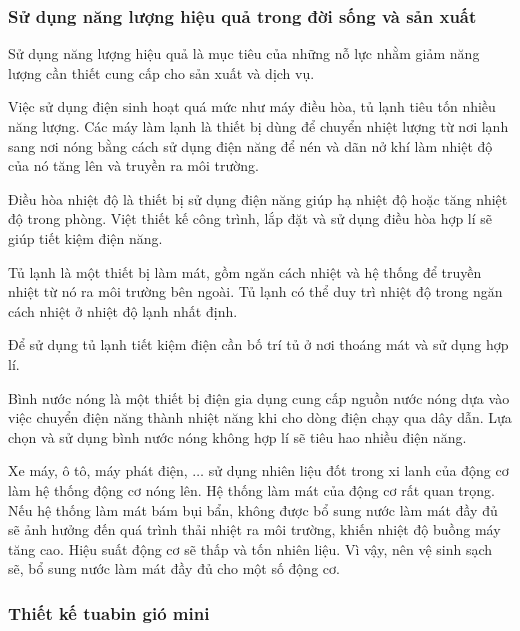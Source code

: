 \subsubsection{Sử dụng năng lượng hiệu quả trong đời sống và sản xuất}
Sử dụng năng lượng hiệu quả là mục tiêu của những nỗ lực nhằm giảm năng lượng cần thiết cung cấp cho sản xuất và dịch vụ.

Việc sử dụng điện sinh hoạt quá mức như máy điều hòa, tủ lạnh tiêu tốn nhiều năng lượng. Các máy làm lạnh là thiết bị dùng để chuyển nhiệt lượng từ nơi lạnh sang nơi nóng bằng cách sử dụng điện năng để nén và dãn nở khí làm nhiệt độ của nó tăng lên và truyền ra môi trường.

Điều hòa nhiệt độ là thiết bị sử dụng điện năng giúp hạ nhiệt độ hoặc tăng nhiệt độ trong phòng. Việt thiết kế công trình, lắp đặt và sử dụng điều hòa hợp lí sẽ giúp tiết kiệm điện năng.

Tủ lạnh là một thiết bị làm mát, gồm ngăn cách nhiệt và hệ thống để truyền nhiệt từ nó ra môi trường bên ngoài. Tủ lạnh có thể duy trì nhiệt độ trong ngăn cách nhiệt ở nhiệt độ lạnh nhất định.

Để sử dụng tủ lạnh tiết kiệm điện cần bố trí tủ ở nơi thoáng mát và sử dụng hợp lí.

Bình nước nóng là một thiết bị điện gia dụng cung cấp nguồn nước nóng dựa vào việc chuyển điện năng thành nhiệt năng khi cho dòng điện chạy qua dây dẫn. Lựa chọn và sử dụng bình nước nóng không hợp lí sẽ tiêu hao nhiều điện năng.

Xe máy, ô tô, máy phát điện, $\ldots$ sử dụng nhiên liệu đốt trong xi lanh của động cơ làm hệ thống động cơ nóng lên. Hệ thống làm mát của động cơ rất quan trọng. Nếu hệ thống làm mát bám bụi bẩn, không được bổ sung nước làm mát đầy đủ sẽ ảnh hưởng đến quá trình thải nhiệt ra môi trường, khiến nhiệt độ buồng máy tăng cao. Hiệu suất động cơ sẽ thấp và tốn nhiên liệu. Vì vậy, nên vệ sinh sạch sẽ, bổ sung nước làm mát đầy đủ cho một số động cơ.
\subsubsection{Thiết kế tuabin gió mini}

